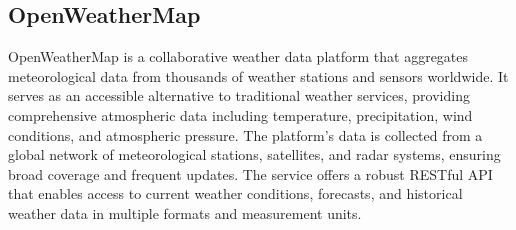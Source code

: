 \subsection{OpenWeatherMap}
OpenWeatherMap is a collaborative weather data platform that aggregates meteorological data from thousands of weather stations and sensors worldwide. It serves as an accessible alternative to traditional weather services, providing comprehensive atmospheric data including temperature, precipitation, wind conditions, and atmospheric pressure. The platform's data is collected from a global network of meteorological stations, satellites, and radar systems, ensuring broad coverage and frequent updates. The service offers a robust RESTful API that enables access to current weather conditions, forecasts, and historical weather data in multiple formats and measurement units.
